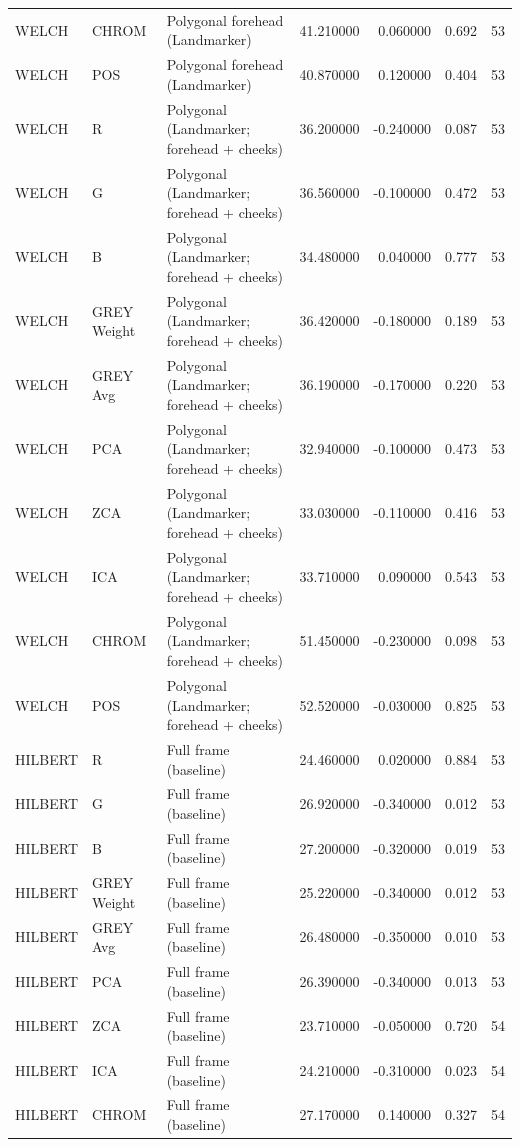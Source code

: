 \begin{table}[htbp]
\begin{tabular}{l l l r r l r}
WELCH & CHROM & Polygonal forehead (Landmarker) & 41.210000 & 0.060000 & 0.692 & 53 \\
WELCH & POS & Polygonal forehead (Landmarker) & 40.870000 & 0.120000 & 0.404 & 53 \\
WELCH & R & Polygonal (Landmarker; forehead + cheeks) & 36.200000 & -0.240000 & 0.087 & 53 \\
WELCH & G & Polygonal (Landmarker; forehead + cheeks) & 36.560000 & -0.100000 & 0.472 & 53 \\
WELCH & B & Polygonal (Landmarker; forehead + cheeks) & 34.480000 & 0.040000 & 0.777 & 53 \\
WELCH & GREY Weight & Polygonal (Landmarker; forehead + cheeks) & 36.420000 & -0.180000 & 0.189 & 53 \\
WELCH & GREY Avg & Polygonal (Landmarker; forehead + cheeks) & 36.190000 & -0.170000 & 0.220 & 53 \\
WELCH & PCA & Polygonal (Landmarker; forehead + cheeks) & 32.940000 & -0.100000 & 0.473 & 53 \\
WELCH & ZCA & Polygonal (Landmarker; forehead + cheeks) & 33.030000 & -0.110000 & 0.416 & 53 \\
WELCH & ICA & Polygonal (Landmarker; forehead + cheeks) & 33.710000 & 0.090000 & 0.543 & 53 \\
WELCH & CHROM & Polygonal (Landmarker; forehead + cheeks) & 51.450000 & -0.230000 & 0.098 & 53 \\
WELCH & POS & Polygonal (Landmarker; forehead + cheeks) & 52.520000 & -0.030000 & 0.825 & 53 \\
HILBERT & R & Full frame (baseline) & 24.460000 & 0.020000 & 0.884 & 53 \\
HILBERT & G & Full frame (baseline) & 26.920000 & -0.340000 & 0.012 & 53 \\
HILBERT & B & Full frame (baseline) & 27.200000 & -0.320000 & 0.019 & 53 \\
HILBERT & GREY Weight & Full frame (baseline) & 25.220000 & -0.340000 & 0.012 & 53 \\
HILBERT & GREY Avg & Full frame (baseline) & 26.480000 & -0.350000 & 0.010 & 53 \\
HILBERT & PCA & Full frame (baseline) & 26.390000 & -0.340000 & 0.013 & 53 \\
HILBERT & ZCA & Full frame (baseline) & 23.710000 & -0.050000 & 0.720 & 54 \\
HILBERT & ICA & Full frame (baseline) & 24.210000 & -0.310000 & 0.023 & 54 \\
HILBERT & CHROM & Full frame (baseline) & 27.170000 & 0.140000 & 0.327 & 54 \\

\end{tabular}
\end{table}
